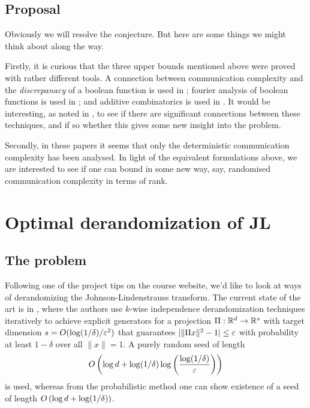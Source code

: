 \subsection{Proposal}

Obviously we will resolve the conjecture. But here are some things we
might think about along the way.

Firstly, it is curious that the three upper bounds mentioned above
were proved with rather different tools. A connection between
communication complexity and the \textit{discrepanacy} of a boolean
function is used in \cite{lovett-2013}; fourier analysis of boolean
functions is used in \cite{tsang-2013}; and additive combinatorics is
used in \cite{ben-sasson-2012}. It would be interesting, as noted in
\cite{lovett-2013}, to see if there are significant connections
between these techniques, and if so whether this gives some new
insight into the problem.

Secondly, in these papers it seems that only the deterministic
communication complexity has been analysed. In light of the equivalent
formulations above, we are interested to see if one can bound in some
new way, say, randomised communication complexity in terms of rank.


\section{Optimal derandomization of JL}

\subsection{The problem}

Following one of the project tips on the course website, we'd like to
look at ways of derandomizing the Johnson-Lindenstrauss transform. The
current state of the art is in \cite{kane-2011}, where the
authors use $k$-wise independence derandomization techniques
iteratively to achieve explicit generators for a projection
$\Pi:\mathbb{R}^d\to\mathbb{R}^s$ with target dimension $s=O(\log(1/\delta)/\varepsilon^2)$
that guarantees $|\|\Pi x\|^2-1|\leq\varepsilon$ with probability at least
$1-\delta$ over all $\|x\|=1$. A purely random seed of length
\[
O \left(\log d + \log(1/\delta)\log \left(\frac{\log(1/\delta)}{\varepsilon}\right)\right)
\]
is used, whereas from the probabilistic method one can show existence
of a seed of length $O \left(\log d + \log(1/\delta)\right)$.

